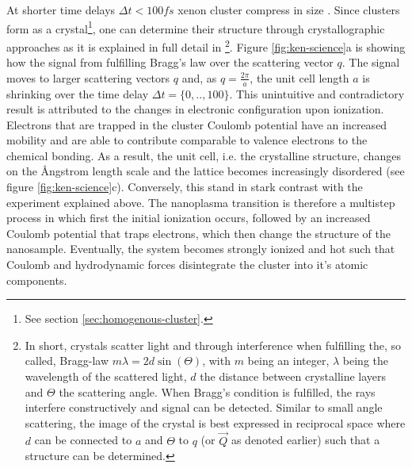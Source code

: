 At shorter time delays $\Delta t<100 fs$ xenon cluster compress in size \citep{Ferguson-2016-SciAdv}. Since clusters form as a crystal\footnote{See section \ref{sec:homogenous-cluster}.}, one can determine their structure through crystallographic approaches as it is explained in full detail in \citep[][chapter 5]{Als-Nielson-2011-JWS}\footnote{In short, crystals scatter light and through interference when fulfilling the, so called, Bragg-law $m \lambda = 2d \sin\left(\Theta\right)$, with $m$ being an integer, $\lambda$ being the wavelength of the scattered light, $d$ the distance between crystalline layers and $\Theta$ the scattering angle. When Bragg's condition is fulfilled, the rays interfere constructively and signal can be detected. Similar to small angle scattering, the image of the crystal is best expressed in reciprocal space where $d$ can be connected to $a$ and $\Theta$ to $q$ (or $\vec{Q}$ as denoted earlier) such that a structure can be determined.}. Figure \ref{fig:ken-science}a is showing how the signal from fulfilling Bragg's law over the scattering vector $q$. The signal moves to larger scattering vectors $q$ and, as $q=\frac{2\pi}{a}$, the unit cell length $a$ is shrinking over the time delay $\Delta t = \{0,..,100\}$. This unintuitive and contradictory result is attributed to the changes in electronic configuration upon ionization. Electrons that are trapped in the cluster Coulomb potential have an increased mobility and are able to contribute comparable to valence electrons to the chemical bonding. As a result, the unit cell, i.e. the crystalline structure, changes on the {\AA}ngstrom length scale and the lattice becomes increasingly disordered (see figure \ref{fig:ken-science}c). Conversely, this stand in stark contrast with the experiment explained above. The nanoplasma transition is therefore a multistep process in which first the initial ionization occurs, followed by an increased Coulomb potential that traps electrons, which then change the structure of the nanosample. Eventually, the system becomes strongly ionized and hot such that Coulomb and hydrodynamic forces disintegrate the cluster into it's atomic components.
%
%
%
